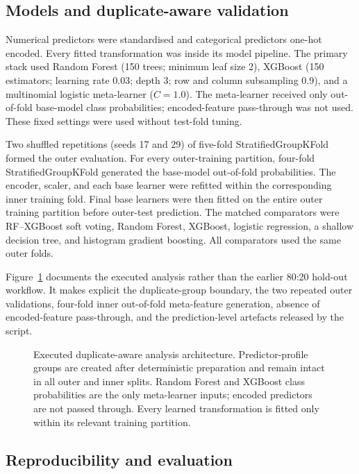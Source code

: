 \subsection{Models and duplicate-aware validation}

Numerical predictors were standardised and categorical predictors one-hot encoded. Every fitted transformation was inside its model pipeline. The primary stack used Random Forest (150 trees; minimum leaf size 2), XGBoost (150 estimators; learning rate 0.03; depth 3; row and column subsampling 0.9), and a multinomial logistic meta-learner ($C=1.0$). The meta-learner received only out-of-fold base-model class probabilities; encoded-feature pass-through was not used. These fixed settings were used without test-fold tuning.

Two shuffled repetitions (seeds 17 and 29) of five-fold StratifiedGroupKFold formed the outer evaluation. For every outer-training partition, four-fold StratifiedGroupKFold generated the base-model out-of-fold probabilities. The encoder, scaler, and each base learner were refitted within the corresponding inner training fold. Final base learners were then fitted on the entire outer training partition before outer-test prediction. The matched comparators were RF--XGBoost soft voting, Random Forest, XGBoost, logistic regression, a shallow decision tree, and histogram gradient boosting. All comparators used the same outer folds.

Figure~\ref{fig:architecture-revision} documents the executed analysis rather than the earlier 80:20 hold-out workflow. It makes explicit the duplicate-group boundary, the two repeated outer validations, four-fold inner out-of-fold meta-feature generation, absence of encoded-feature pass-through, and the prediction-level artefacts released by the script.

\begin{figure}[width=\textwidth,pos=!tbp,align=\centering]
\centering
{}
\caption{Executed duplicate-aware analysis architecture. Predictor-profile groups are created after deterministic preparation and remain intact in all outer and inner splits. Random Forest and XGBoost class probabilities are the only meta-learner inputs; encoded predictors are not passed through. Every learned transformation is fitted only within its relevant training partition.}
\label{fig:architecture-revision}
\end{figure}

\subsection{Reproducibility and evaluation}

